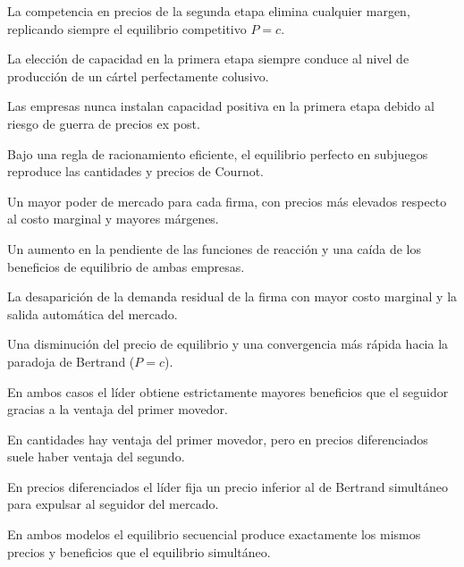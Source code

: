 \begin{opts}
    \item La competencia en precios de la segunda etapa elimina cualquier margen, replicando siempre el equilibrio competitivo $P = c$.
    \item La elección de capacidad en la primera etapa siempre conduce al nivel de producción de un cártel perfectamente colusivo.
    \item Las empresas nunca instalan capacidad positiva en la primera etapa debido al riesgo de guerra de precios ex post.
    \item Bajo una regla de racionamiento eficiente, el equilibrio perfecto en subjuegos reproduce las cantidades y precios de Cournot.
\end{opts}

\begin{opts}
    \item Un mayor poder de mercado para cada firma, con precios más elevados respecto al costo marginal y mayores márgenes.
    \item Un aumento en la pendiente de las funciones de reacción y una caída de los beneficios de equilibrio de ambas empresas.
    \item La desaparición de la demanda residual de la firma con mayor costo marginal y la salida automática del mercado.
    \item Una disminución del precio de equilibrio y una convergencia más rápida hacia la paradoja de Bertrand ($P = c$).
\end{opts}

\begin{opts}
    \item En ambos casos el líder obtiene estrictamente mayores beneficios que el seguidor gracias a la ventaja del primer movedor.
    \item En cantidades hay ventaja del primer movedor, pero en precios diferenciados suele haber ventaja del segundo.
    \item En precios diferenciados el líder fija un precio inferior al de Bertrand simultáneo para expulsar al seguidor del mercado.
    \item En ambos modelos el equilibrio secuencial produce exactamente los mismos precios y beneficios que el equilibrio simultáneo.
\end{opts}

